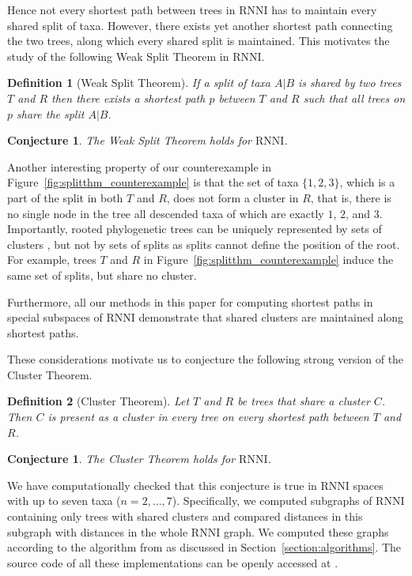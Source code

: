 \documentclass{amsart}
\newcommand{\rnni}{\mathrm{RNNI}}
\newtheorem*{definition}{Definition}
\newtheorem{conjecture}[theorem]{Conjecture}
\begin{document}
Hence not every shortest path between trees in $\rnni$ has to maintain every shared split of taxa.
However, there exists yet another shortest path connecting the two trees, along which every shared split is maintained.
This motivates the study of the following Weak Split Theorem in $\rnni$.

\begin{definition}[Weak Split Theorem]
If a split of taxa $A | B$ is shared by two trees $T$ and $R$ then there exists a shortest path $p$ between $T$ and $R$ such that all trees on $p$ share the split $A | B$.
\end{definition}

\begin{conjecture}
\label{conjecture:weak_split_theorem}
The Weak Split Theorem holds for $\rnni$.
\end{conjecture}

Another interesting property of our counterexample in Figure~\ref{fig:splitthm_counterexample} is that the set of taxa $\{1, 2, 3\}$, which is a part of the split in both $T$ and $R$, does not form a cluster in $R$, that is, there is no single node in the tree all descended taxa of which are exactly $1$, $2$, and $3$.
Importantly, rooted phylogenetic trees can be uniquely represented by sets of clusters \autocite{Steel2016-ye}, but not by sets of splits as splits cannot define the position of the root.
For example, trees $T$ and $R$ in Figure~\ref{fig:splitthm_counterexample} induce the same set of splits, but share no cluster.

Furthermore, all our methods in this paper for computing shortest paths in special subspaces of $\rnni$ demonstrate that shared clusters are maintained along shortest paths.

These considerations motivate us to conjecture the following strong version of the Cluster Theorem.

\begin{definition}[Cluster Theorem]
Let $T$ and $R$ be trees that share a cluster $C$.
Then $C$ is present as a cluster in every tree on every shortest path between $T$ and $R$.
\end{definition}

\begin{conjecture}
\label{conjecture:cluster_theorem}
The Cluster Theorem holds for $\rnni$.
\end{conjecture}

We have computationally checked that this conjecture is true in $\rnni$ spaces with up to seven taxa ($n = 2, \ldots, 7$).
Specifically, we computed subgraphs of $\rnni$ containing only trees with shared clusters and compared distances in this subgraph with distances in the whole $\rnni$ graph.
We computed these graphs according to the algorithm from \autocite{Gavryushkin2018-ol} as discussed in Section~\ref{section:algorithms}.
The source code of all these implementations can be openly accessed at \autocite{Collienne2019}.
\end{document}
